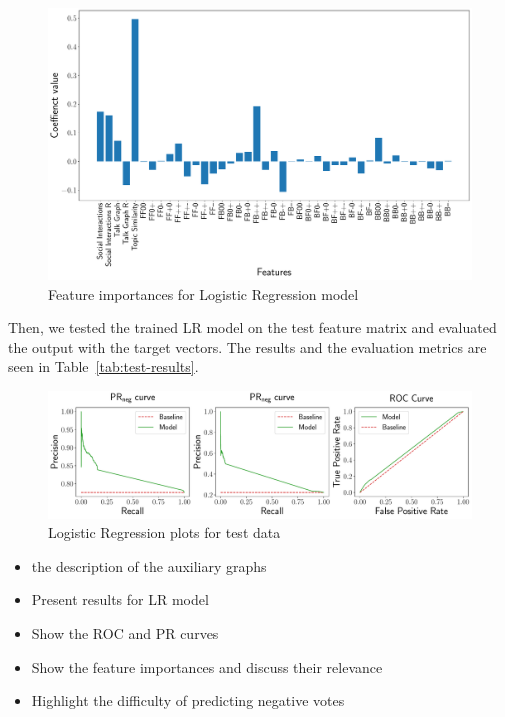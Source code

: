 \begin{figure}[htp]
    \centering
    \includegraphics[width=\textwidth]{images/Logistic Regression_features.pdf}
    \caption{Feature importances for Logistic Regression model }
    \label{fig:lr-feature-importances}
\end{figure}


Then, we tested the trained LR model on the test feature matrix and evaluated the output with the target vectors.
The results and the evaluation metrics are seen in Table~\ref{tab:test-results}.

\begin{figure}[htp]
    \centering
    \includegraphics[width=\textwidth]{images/Logisitc Regression_test.pdf}
    \caption{Logistic Regression plots for test data}
    \label{fig:lr-test-plots}
\end{figure}
\begin{itemize}
    \item the description of the auxiliary graphs 
    \item Present results for LR model
    \item Show the ROC and PR curves
    \item Show the feature importances and discuss their relevance 
    \item Highlight the difficulty of predicting negative votes
\end{itemize}

